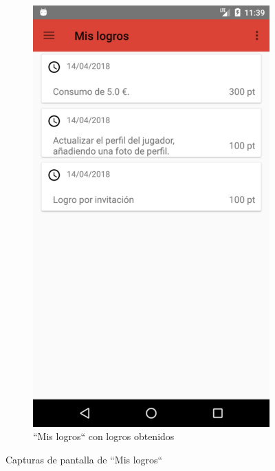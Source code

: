\documentclass[twoside]{report}
\begin{document}
\begin{figure}[H]
\begin{center}
\begin{subfigure}[t]{.3\linewidth}
		\includegraphics[scale=0.25]{images/userguide/6.png}
		\caption{“Mis logros“ con logros obtenidos}
	\end{subfigure}
\caption{Capturas de pantalla de “Mis logros“}
\end{center}
\end{figure}
\end{document}
